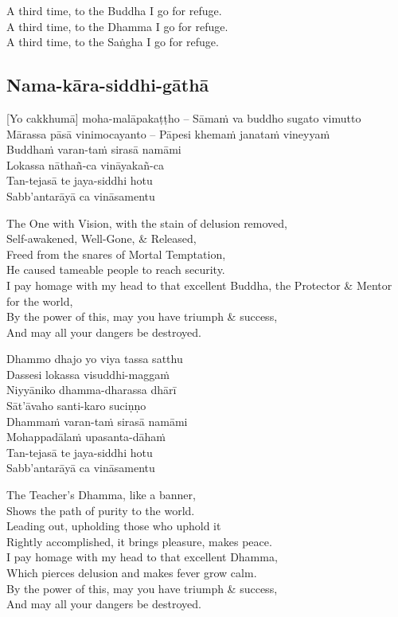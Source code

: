 \begin{english}
  A third time, to the Buddha I go for refuge.\\
  A third time, to the Dhamma I go for refuge.\\
  A third time, to the Saṅgha I go for refuge.
\end{english}

\subsection{Nama-kāra-siddhi-gāthā}
\label{nama-kara-siddhi-gatha}
[Yo cakkhumā] moha-malāpakaṭṭho – Sāmaṁ va buddho sugato vimutto\\
Mārassa pāsā vinimocayanto – Pāpesi khemaṁ janataṁ vineyyaṁ\\
Buddhaṁ varan-taṁ sirasā namāmi\\
Lokassa nāthañ-ca vināyakañ-ca\\
Tan-tejasā te jaya-siddhi hotu\\
Sabb’antarāyā ca vināsamentu

\begin{english}
  The One with Vision, with the stain of delusion removed,\\
  Self-awakened, Well-Gone, \& Released,\\
  Freed from the snares of Mortal Temptation,\\
  He caused tameable people to reach security.\\
  I pay homage with my head to that excellent Buddha, the Protector \& Mentor for the world,\\
  By the power of this, may you have triumph \& success,\\
  And may all your dangers be destroyed.
\end{english}

Dhammo dhajo yo viya tassa satthu\\
Dassesi lokassa visuddhi-maggaṁ\\
Niyyāniko dhamma-dharassa dhārī\\
Sāt’āvaho santi-karo suciṇṇo\\
Dhammaṁ varan-taṁ sirasā namāmi\\
Mohappadālaṁ upasanta-dāhaṁ\\
Tan-tejasā te jaya-siddhi hotu\\
Sabb’antarāyā ca vināsamentu

\begin{english}
  The Teacher's Dhamma, like a banner,\\
  Shows the path of purity to the world.\\
  Leading out, upholding those who uphold it\\
  Rightly accomplished, it brings pleasure, makes peace.\\
  I pay homage with my head to that excellent Dhamma,\\
  Which pierces delusion and makes fever grow calm.\\
  By the power of this, may you have triumph \& success,\\
  And may all your dangers be destroyed.
\end{english}

